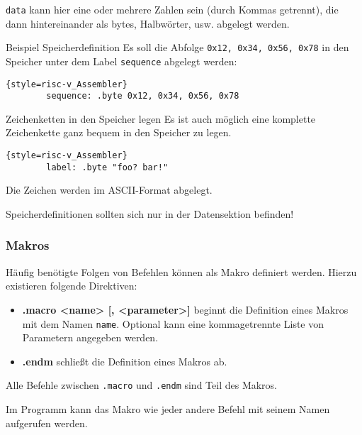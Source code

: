 \texttt{data} kann hier eine oder mehrere Zahlen sein (durch Kommas getrennt), die dann hintereinander als bytes, Halbwörter, usw. abgelegt werden.

\begin{exampleblock}{Beispiel Speicherdefinition}
	Es soll die Abfolge \texttt{0x12, 0x34, 0x56, 0x78} in den Speicher unter dem Label \texttt{sequence} abgelegt werden:
	\begin{lstlisting}{style=risc-v_Assembler}
		sequence: .byte 0x12, 0x34, 0x56, 0x78
	\end{lstlisting}
\end{exampleblock}

\begin{infoblock}{Zeichenketten in den Speicher legen}
	Es ist auch möglich eine komplette Zeichenkette ganz bequem in den Speicher zu legen.
	\begin{lstlisting}{style=risc-v_Assembler}
		label: .byte "foo? bar!"
	\end{lstlisting}
	Die Zeichen werden im ASCII-Format abgelegt.
\end{infoblock}

\begin{warningblock}
	Speicherdefinitionen sollten sich nur in der Datensektion befinden!
\end{warningblock}

\subsubsection{Makros}

Häufig benötigte Folgen von Befehlen können als Makro definiert werden. Hierzu
existieren folgende Direktiven:

\begin{itemize}
	\item \textbf{.macro <name> [, <parameter>]} beginnt die Definition eines
	Makros mit dem Namen \texttt{name}. Optional kann eine kommagetrennte Liste
	von Parametern angegeben werden.
	\item \textbf{.endm} schließt die Definition eines Makros ab.
\end{itemize}

Alle Befehle zwischen \texttt{.macro} und \texttt{.endm} sind Teil des Makros.

Im Programm kann das Makro wie jeder andere Befehl mit seinem Namen aufgerufen
werden.

